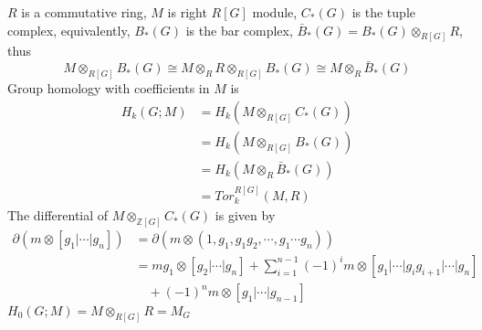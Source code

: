 \documentclass[../main.tex]{subfiles}
\begin{document}
\begin{definition}
$R$ is a commutative ring, $M$ is right $R[G]$ module, $C_*(G)$ is the tuple complex, equivalently, $B_*(G)$ is the bar complex, $\bar B_*(G)=B_*(G)\otimes_{R[G]}R$, thus
\[M\otimes_{R[G]}B_*(G)\cong M\otimes_{R}R\otimes_{R[G]}B_*(G)\cong M\otimes_R\bar B_*(G)\]
Group homology with coefficients in $M$ is
\begin{align*}
H_k(G;M)&=H_k(M\otimes_{R[G]}C_*(G)) \\
&=H_k(M\otimes_{R[G]}B_*(G)) \\
&=H_k(M\otimes_{R}\bar B_*(G)) \\
&=Tor_k^{R[G]}(M,R)
\end{align*}
The differential of $M\otimes_{\mathbb Z[G]} C_*(G)$ is given by
\begin{align*}
\partial(m\otimes[g_1|\cdots|g_n])&=\partial(m\otimes(1,g_1,g_1g_2,\cdots,g_1\cdots g_n)) \\
&=mg_1\otimes[g_2|\cdots|g_n]+\sum_{i=1}^{n-1}(-1)^im\otimes[g_1|\cdots|g_ig_{i+1}|\cdots|g_n] \\
&\quad+(-1)^nm\otimes[g_1|\cdots|g_{n-1}]
\end{align*}
$H_0(G;M)=M\otimes_{R[G]}R=M_G$
\end{definition}
\end{document}
